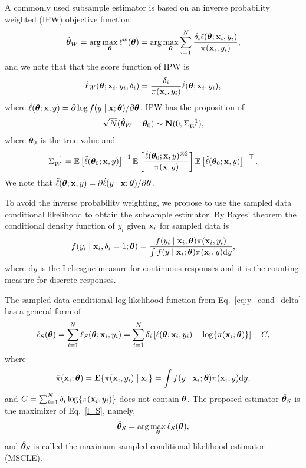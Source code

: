 \documentclass[12pt,hidelinks]{article}
\begin{document}
A commonly used subsample estimator is based on an inverse probability weighted (IPW) objective function,
\begin{align*}
    {\hat{\bm{\theta}}}_W = \arg\max_{\bm{\theta}} \ell^w(\bm{\theta}) = \arg\max_{\bm{\theta}} \sum_{i=1}^{N} \frac{\delta_i \ell(\bm{\theta}; \mathbf{x}_i, y_i)}{\pi(\mathbf{x}_i, y_i)},
\end{align*}
and we note that that the score function of IPW is
\begin{align}\label{psi_W}
    \dot \ell_W (\bm{\theta}; \mathbf{x}_i, y_i, \delta_i) = \frac{\delta_i}{\pi(\mathbf{x}_i,y_i)} \dot \ell (\bm{\theta};\mathbf{x}_i, y_i),
\end{align}
where $\dot \ell(\bm{\theta}; \mathbf{x}, y) = \partial \log f(y \mid \mathbf{x}; \bm{\theta}) / \partial \bm{\theta}$.
IPW has the proposition of 
\begin{align}
    \sqrt{N}({\hat{\bm{\theta}}}_W - \bm{\theta}_0) \sim \mathbf{N}(0, \Sigma_W^{-1}),
\end{align}
where $\bm{\theta}_0$ is the true value and 
\begin{align}\label{eq:SigW}
    \Sigma_W^{-1} = \mathbb{E} \left[\ddot \ell( \bm{\theta}_0;\mathbf{x}, y)\right]^{-1} \mathbb{E} \left[\frac{\dot \ell( \bm{\theta}_0;\mathbf{x}, y)^{\otimes 2}}{\pi(\mathbf{x}, y)}\right] \mathbb{E} \left[\ddot \ell( \bm{\theta}_0;\mathbf{x}, y)\right]^{-\top}.
\end{align}
We note that $\ddot \ell(\bm{\theta}; \mathbf{x}, y) = \partial \dot \ell(y \mid \mathbf{x}; \bm{\theta}) / \partial \bm{\theta}$.


To avoid the inverse probability weighting, we propose to use the sampled data conditional likelihood to obtain the subsample estimator. By Bayes' theorem the conditional density function of $y_i$ given $\mathbf{x}_i$ for sampled data is
\begin{align}\label{eq:y_cond_delta}
    f(y_i \mid \mathbf{x}_i, \delta_i = 1; \bm{\theta}) = \frac{f(y_i \mid \mathbf{x}_i; \bm{\theta}) \pi(\mathbf{x}_i, y_i)}{\int f(y \mid \mathbf{x}_i; \bm{\theta}) \pi(\mathbf{x}_i, y)   \mathrm{d}y},
\end{align}
where $\mathrm{d}y$ is the Lebesgue measure for continuous responses and it is the counting measure for discrete responses.

The sampled data conditional log-likelihood function from Eq.~\eqref{eq:y_cond_delta} has a general form of
\begin{align}\label{l_S}
    \ell_S(\bm{\theta}) = \sum_{i=1}^{N} \ell_S(\bm{\theta}; \mathbf{x}_i, y_i) = \sum_{i=1}^{N} \delta_i \left[ \ell(\bm{\theta}; \mathbf{x}_i, y_i) - \log\{\bar{\pi}(\mathbf{x}_i; \bm{\theta})\} \right] + C,
\end{align}
where
\begin{equation*}
    \bar{\pi}(\mathbf{x}_i; \bm{\theta}) = \mathbf{E}\{\pi(\mathbf{x}_i, y_i) \mid \mathbf{x}_i\} = \int f(y \mid \mathbf{x}_i; \bm{\theta}) \pi(\mathbf{x}_i, y)   \mathrm{d}y,
\end{equation*}
and $C = \sum_{i=1}^{N} \delta_i \log\{\pi(\mathbf{x}_i, y_i)\}$ does not contain $\bm{\theta}$. The proposed estimator ${\hat{\bm{\theta}}}_S$ is the maximizer of Eq.~\eqref{l_S}, namely,
\begin{align}\label{eq:theta_S}
    {\hat{\bm{\theta}}}_S = \arg\max_{\bm{\theta}} \ell_S(\bm{\theta}),
\end{align}
and ${\hat{\bm{\theta}}}_S$ is called the maximum sampled conditional likelihood estimator (MSCLE).
\end{document}
